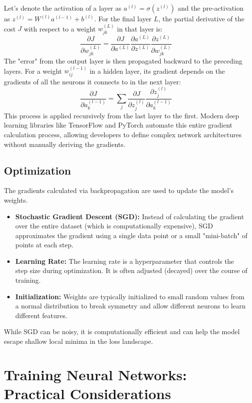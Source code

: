 \documentclass{article}
\begin{document}
\begin{multicols}{2}
	Let's denote the activation of a layer as $a^{(l)} = \sigma(z^{(l)})$ and the pre-activation as $z^{(l)} = W^{(l)} a^{(l-1)} + b^{(l)}$. For the final layer $L$, the partial derivative of the cost $J$ with respect to a weight $w_{jk}^{(L)}$ in that layer is:
	$$ \frac{\partial J}{\partial w_{jk}^{(L)}} = \frac{\partial J}{\partial a^{(L)}} \frac{\partial a^{(L)}}{\partial z^{(L)}} \frac{\partial z^{(L)}}{\partial w_{jk}^{(L)}} $$
	The "error" from the output layer is then propagated backward to the preceding layers. For a weight $w_{ij}^{(l-1)}$ in a hidden layer, its gradient depends on the gradients of all the neurons it connects to in the next layer:
	$$ \frac{\partial J}{\partial a_k^{(l-1)}} = \sum_j \frac{\partial J}{\partial z_j^{(l)}} \frac{\partial z_j^{(l)}}{\partial a_k^{(l-1)}} $$
	This process is applied recursively from the last layer to the first. Modern deep learning libraries like TensorFlow and PyTorch automate this entire gradient calculation process, allowing developers to define complex network architectures without manually deriving the gradients.

	\subsection{Optimization}
	The gradients calculated via backpropagation are used to update the model's weights.
	\begin{itemize}
		\item \textbf{Stochastic Gradient Descent (SGD):} Instead of calculating the gradient over the entire dataset (which is computationally expensive), SGD approximates the gradient using a single data point or a small "mini-batch" of points at each step.
		\item \textbf{Learning Rate:} The learning rate is a hyperparameter that controls the step size during optimization. It is often adjusted (decayed) over the course of training.
		\item \textbf{Initialization:} Weights are typically initialized to small random values from a normal distribution to break symmetry and allow different neurons to learn different features.
	\end{itemize}
	While SGD can be noisy, it is computationally efficient and can help the model escape shallow local minima in the loss landscape.


	\section{Training Neural Networks: Practical Considerations}


\end{multicols}
\end{document}
